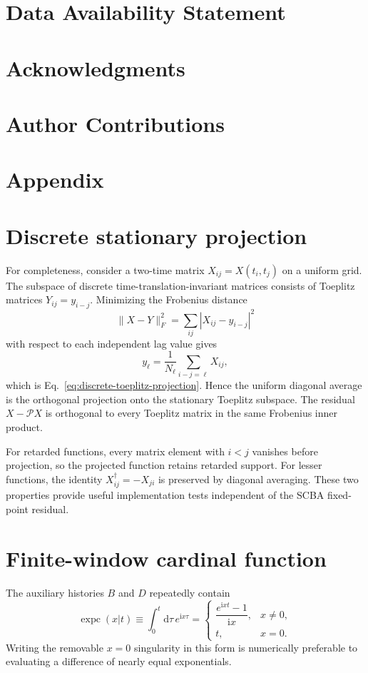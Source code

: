 \documentclass[
 reprint,
 superscriptaddress,
 amsmath,amssymb,
 aps,prb,
 longbibliography,
 floatfix
]{revtex4-2}
\newcommand{\dd}{\mathrm{d}}
\newcommand{\ii}{\mathrm{i}}
\newcommand{\expc}{\operatorname{expc}}
\newcommand{\proj}{\mathcal P}
\begin{document}
\section*{Data Availability Statement}
\section*{Acknowledgments}
\section*{Author Contributions}
\section*{Appendix}

\appendix

\section{Discrete stationary projection}
\label{app:projection}

For completeness, consider a two-time matrix \(X_{ij}=X(t_i,t_j)\) on a uniform grid. The subspace of discrete time-translation-invariant matrices consists of Toeplitz matrices \(Y_{ij}=y_{i-j}\). Minimizing the Frobenius distance
\begin{equation*}
\|X-Y\|_F^2
=
\sum_{ij}|X_{ij}-y_{i-j}|^2
\end{equation*}
with respect to each independent lag value gives
\begin{equation*}
y_\ell
=
\frac{1}{N_\ell}
\sum_{i-j=\ell}X_{ij},
\end{equation*}
which is Eq.~\eqref{eq:discrete-toeplitz-projection}. Hence the uniform diagonal average is the orthogonal projection onto the stationary Toeplitz subspace. The residual \(X-\proj X\) is orthogonal to every Toeplitz matrix in the same Frobenius inner product.

For retarded functions, every matrix element with \(i<j\) vanishes before projection, so the projected function retains retarded support. For lesser functions, the identity \(X_{ij}^\dagger=-X_{ji}\) is preserved by diagonal averaging. These two properties provide useful implementation tests independent of the SCBA fixed-point residual.


\section{Finite-window cardinal function}

The auxiliary histories $B$ and $D$ repeatedly contain
\begin{equation*}
\expc(x|t)\equiv\int_0^t\dd\tau\,e^{\ii x\tau}
=\begin{cases}
\dfrac{e^{\ii xt}-1}{\ii x},&x\neq0,\\[6pt]
t,&x=0.
\end{cases}
\end{equation*}
Writing the removable $x=0$ singularity in this form is numerically preferable to evaluating a difference of nearly equal exponentials.


\end{document}

